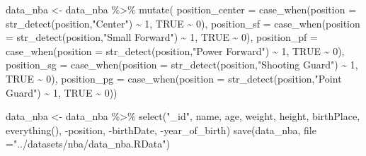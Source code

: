 \documentclass[
]{book}
\newenvironment{Shaded}{\begin{snugshade}}{\end{snugshade}}
\newcommand{\AttributeTok}[1]{\textcolor[rgb]{0.77,0.63,0.00}{#1}}
\newcommand{\ConstantTok}[1]{\textcolor[rgb]{0.00,0.00,0.00}{#1}}
\newcommand{\DecValTok}[1]{\textcolor[rgb]{0.00,0.00,0.81}{#1}}
\newcommand{\FunctionTok}[1]{\textcolor[rgb]{0.00,0.00,0.00}{#1}}
\newcommand{\NormalTok}[1]{#1}
\newcommand{\OtherTok}[1]{\textcolor[rgb]{0.56,0.35,0.01}{#1}}
\newcommand{\SpecialCharTok}[1]{\textcolor[rgb]{0.00,0.00,0.00}{#1}}
\newcommand{\StringTok}[1]{\textcolor[rgb]{0.31,0.60,0.02}{#1}}
\begin{document}
\begin{Shaded}
\begin{Highlighting}[]
\NormalTok{data\_nba }\OtherTok{\textless{}{-}}\NormalTok{ data\_nba }\SpecialCharTok{\%\textgreater{}\%}
  \FunctionTok{mutate}\NormalTok{(}
    \AttributeTok{position\_center =} 
      \FunctionTok{case\_when}\NormalTok{(}\AttributeTok{position =} \FunctionTok{str\_detect}\NormalTok{(position,}\StringTok{"Center"}\NormalTok{) }\SpecialCharTok{\textasciitilde{}} \DecValTok{1}\NormalTok{,}
                \ConstantTok{TRUE} \SpecialCharTok{\textasciitilde{}} \DecValTok{0}\NormalTok{),}
    \AttributeTok{position\_sf =} 
      \FunctionTok{case\_when}\NormalTok{(}\AttributeTok{position =} \FunctionTok{str\_detect}\NormalTok{(position,}\StringTok{"Small Forward"}\NormalTok{) }\SpecialCharTok{\textasciitilde{}} \DecValTok{1}\NormalTok{,}
                \ConstantTok{TRUE} \SpecialCharTok{\textasciitilde{}} \DecValTok{0}\NormalTok{),}
    \AttributeTok{position\_pf =} 
      \FunctionTok{case\_when}\NormalTok{(}\AttributeTok{position =} \FunctionTok{str\_detect}\NormalTok{(position,}\StringTok{"Power Forward"}\NormalTok{) }\SpecialCharTok{\textasciitilde{}} \DecValTok{1}\NormalTok{,}
                \ConstantTok{TRUE} \SpecialCharTok{\textasciitilde{}} \DecValTok{0}\NormalTok{),}
    \AttributeTok{position\_sg =} 
      \FunctionTok{case\_when}\NormalTok{(}\AttributeTok{position =} \FunctionTok{str\_detect}\NormalTok{(position,}\StringTok{"Shooting Guard"}\NormalTok{) }\SpecialCharTok{\textasciitilde{}} \DecValTok{1}\NormalTok{,}
                \ConstantTok{TRUE} \SpecialCharTok{\textasciitilde{}} \DecValTok{0}\NormalTok{),}
    \AttributeTok{position\_pg =} 
      \FunctionTok{case\_when}\NormalTok{(}\AttributeTok{position =} \FunctionTok{str\_detect}\NormalTok{(position,}\StringTok{"Point Guard"}\NormalTok{) }\SpecialCharTok{\textasciitilde{}} \DecValTok{1}\NormalTok{,}
                \ConstantTok{TRUE} \SpecialCharTok{\textasciitilde{}} \DecValTok{0}\NormalTok{))}



\NormalTok{data\_nba }\OtherTok{\textless{}{-}}\NormalTok{ data\_nba }\SpecialCharTok{\%\textgreater{}\%}
  \FunctionTok{select}\NormalTok{(}\StringTok{"\_id"}\NormalTok{, name, age, weight, height, birthPlace, }\FunctionTok{everything}\NormalTok{(), }\SpecialCharTok{{-}}\NormalTok{position, }\SpecialCharTok{{-}}\NormalTok{birthDate, }\SpecialCharTok{{-}}\NormalTok{year\_of\_birth)}
\FunctionTok{save}\NormalTok{(data\_nba, }\AttributeTok{file =}\StringTok{"../datasets/nba/data\_nba.RData"}\NormalTok{)}
\end{Highlighting}
\end{Shaded}
\end{document}
